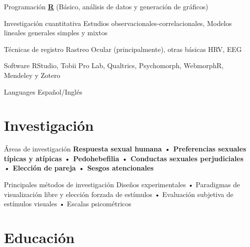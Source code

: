 \documentclass[11pt,a4paper,]{awesome-cv}
\begin{document}
\begin{cvskills}
  \cvskill
    {Programación}
    {\href{https://www.r-project.org/}{\textbf{R}} (Básico, análisis de datos y generación de gráficos)}

  \cvskill
    {Investigación cuantitativa}
    {Estudios observacionales-correlacionales, Modelos lineales generales simples y mixtos}
  
  \cvskill
    {Técnicas de registro}
    {Rastreo Ocular (principalmente), otras básicas HRV, EEG}

  \cvskill
    {Software}
    {RStudio, Tobii Pro Lab, Qualtrics, Psychomorph, WebmorphR, Mendeley y Zotero}

  \cvskill
    {Languages}
    {Español/Inglés}
\end{cvskills}

\hypertarget{investigaciuxf3n}{%
\section{Investigación}\label{investigaciuxf3n}}

\begin{cvskills}
  \cvskill
    {Áreas de investigación}
    {\textbf{Respuesta sexual humana • Preferencias sexuales típicas y atípicas • Pedohebefilia • Conductas \newline sexuales perjudiciales • Elección de pareja • Sesgos atencionales}}

  \cvskill
    {Principales métodos de investigación}
    {Diseños experimentales • Paradigmas de visualización libre y elección forzada de estímulos • Evaluación \newline subjetiva de estímulos visuales • Escalas psicométricos}
\end{cvskills}

\hypertarget{educaciuxf3n}{%
\section{Educación}\label{educaciuxf3n}}
\end{document}
